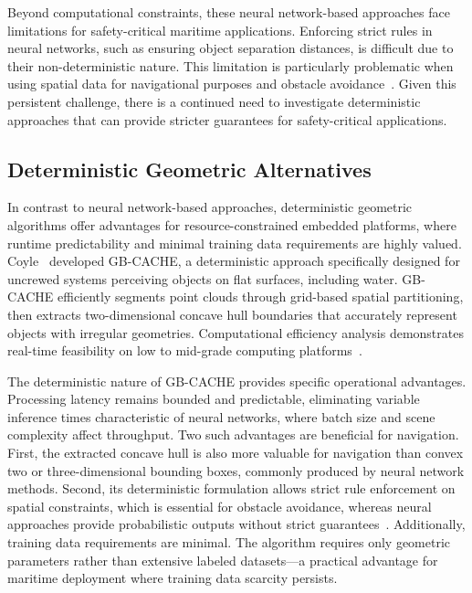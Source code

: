 \documentclass{erauthesis}
\begin{document}
Beyond computational constraints, these neural network-based approaches face limitations for safety-critical maritime applications.
Enforcing strict rules in neural networks, such as ensuring object separation distances, is difficult due to their non-deterministic nature.
This limitation is particularly problematic when using spatial data for navigational purposes and obstacle avoidance~\cite{coyleE}.
Given this persistent challenge, there is a continued need to investigate deterministic approaches that can provide stricter guarantees for safety-critical applications. 

\subsection{Deterministic Geometric Alternatives}

In contrast to neural network-based approaches, deterministic geometric algorithms offer advantages for resource-constrained embedded platforms, where runtime predictability and minimal training data requirements are highly valued.
Coyle~\cite{coyleE} developed \ac{GB-CACHE}, a deterministic approach specifically designed for uncrewed systems perceiving objects on flat surfaces, including water.
GB-CACHE efficiently segments point clouds through grid-based spatial partitioning, then extracts two-dimensional concave hull boundaries that accurately represent objects with irregular geometries.
Computational efficiency analysis demonstrates real-time feasibility on low to mid-grade computing platforms~\cite{coyleE}.

The deterministic nature of GB-CACHE provides specific operational advantages.
Processing latency remains bounded and predictable, eliminating variable inference times characteristic of neural networks, where batch size and scene complexity affect throughput. 
Two such advantages are beneficial for navigation. 
First, the extracted concave hull is also more valuable for navigation than convex two or three-dimensional bounding boxes, commonly produced by neural network methods.
Second, its deterministic formulation allows strict rule enforcement on spatial constraints, which is essential for obstacle avoidance, whereas neural approaches provide probabilistic outputs without strict guarantees~\cite{coyleE}.
Additionally, training data requirements are minimal. The algorithm requires only geometric parameters rather than extensive labeled datasets—a practical advantage for maritime deployment where training data scarcity persists.
\end{document}
